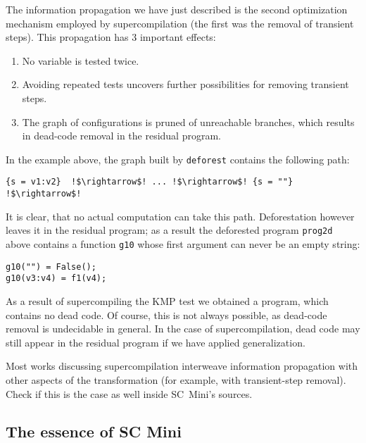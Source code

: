 The information propagation we have just described is the second optimization mechanism 
employed by supercompilation (the first was the removal of transient steps).
This propagation has 3 important effects:
\begin{enumerate}
  \item No variable is tested twice.
  \item Avoiding repeated tests uncovers further possibilities for removing transient steps.
  \item The graph of configurations is pruned of unreachable branches, which results in dead-code 
  removal in the residual program.
\end{enumerate}
In the example above, the graph built by \texttt{deforest} contains the following path:
\begin{lstlisting}[language=sll,escapechar=!]
{s = v1:v2}  !$\rightarrow$! ... !$\rightarrow$! {s = ""} !$\rightarrow$!
\end{lstlisting}
It is clear, that no actual computation can take this path. 
Deforestation however leaves it in the residual program;
as a result the deforested program \texttt{prog2d} above contains a function
\texttt{g10} whose first argument can never be an empty string:
\begin{lstlisting}[language=sll]
g10("") = False();
g10(v3:v4) = f1(v4);
\end{lstlisting}

As a result of supercompiling the KMP test we obtained a program, which contains no dead code.
Of course, this is not always possible, as dead-code removal is undecidable in general.
In the case of supercompilation, dead code may still appear in the residual program
if we have applied generalization.

\begin{exercise}
Most works discussing supercompilation interweave information propagation with other
aspects of the transformation (for example, with transient-step removal).
Check if this is the case as well inside SC~Mini's sources.
\end{exercise}

\subsection{The essence of SC Mini}

